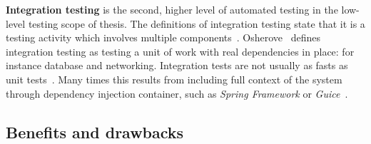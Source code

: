     \textbf{Integration testing} is the second, higher level of automated testing in the low-level testing scope of thesis.
    The definitions of integration testing state that it is a testing
    activity which involves multiple components~\cite{whittaker2000software,artofunit2013}. Osherove~\cite{artofunit2013}
    defines integration testing as testing a unit of work with real dependencies in place: for instance database and  networking.
    Integration tests are not usually as fasts as unit tests~\cite{artofunit2013}. Many times this results from including
    full context of the system through dependency injection container, such as \textit{Spring Framework} or \textit{Guice}~\cite{kapelonis2016java}.

    \subsection{Benefits and drawbacks}

